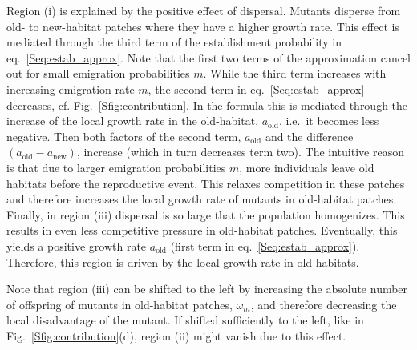 \documentclass[a4paper,11pt]{scrartcl}
\newcommand{\chg}[1]{\textcolor{change}{#1}}
\begin{document}
Region (i) is explained by the positive effect of dispersal. Mutants disperse from old- to new-habitat patches where they \chg{have a higher growth rate}. This effect is mediated through the third term of the establishment probability in eq.~\eqref{Seq:estab_approx}. \chg{Note that the first two terms of the approximation cancel out for small emigration probabilities $m$.}
While the third term increases with increasing emigration rate $m$, the second term in eq.~\eqref{Seq:estab_approx} decreases, cf. Fig.~\ref{Sfig:contribution}. 
In the formula this is mediated through \chg{the increase of the local growth rate in the old-habitat, $a_{\text{old}}$, i.e.\ it becomes less negative. Then both factors of the second term, $a_{\text{old}}$ and the difference $(a_{\text{old}}-a_{\text{new}})$, increase (which in turn decreases term two). The }\chg{intuitive} reason is that due to larger emigration probabilities $m$, more individuals leave old habitats before the reproductive event. This relaxes competition in these patches and therefore increases the local growth rate of mutants in old-habitat patches.   
%
Finally, in region (iii) dispersal is so large that the population homogenizes. This results in even less competitive pressure in old-habitat patches. Eventually, this yields a positive growth rate $a_{\text{old}}$ (first term in eq.~\eqref{Seq:estab_approx}). Therefore, this region is driven by the local growth rate in old habitats.

Note that region (iii) can be shifted to the left by increasing the absolute number of offspring of mutants in old-habitat patches, $\omega_m$, and therefore decreasing the local disadvantage of the mutant. If shifted sufficiently to the left, like in Fig.~\ref{Sfig:contribution}(d), region (ii) might vanish due to this effect.
\end{document}
